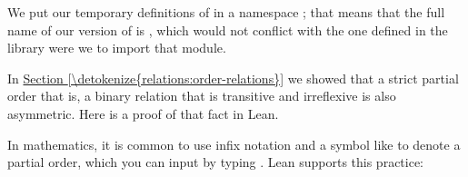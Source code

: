 \documentclass[letterpaper,10pt,english]{sphinxmanual}
\begin{document}
\sphinxAtStartPar
We put our temporary definitions of in a namespace ;
that means that the full name of our version of  is
,
which would not conflict with the one defined in the library
were we to import that module.

\sphinxAtStartPar
In \hyperref[\detokenize{relations:order-relations}]{Section \ref{\detokenize{relations:order-relations}}} we showed that a strict partial order \sphinxhyphen{}
that is, a binary relation that is transitive and irreflexive \sphinxhyphen{}
is also asymmetric. Here is a proof of that fact in Lean.

\begin{sphinxVerbatim}[commandchars=\\\{\}]
         
                
    
       
       
           
           
   
    
   
       
\end{sphinxVerbatim}

\sphinxAtStartPar
In mathematics,
it is common to use infix notation and a symbol like 
to denote a partial order,
which you can input by typing .
Lean supports this practice:
\end{document}
